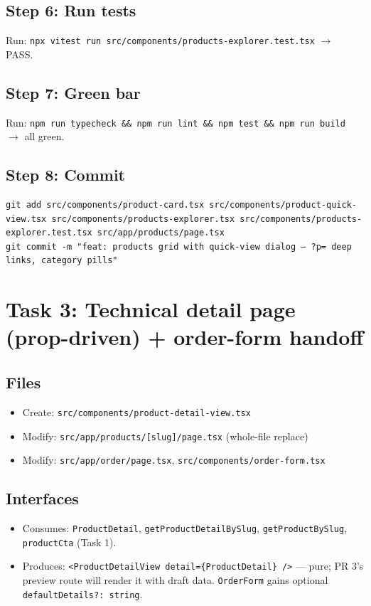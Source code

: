 \documentclass[11pt,a4paper]{article}
\begin{document}
\subsection*{Step 6: Run tests}

Run: \texttt{npx vitest run src/components/products-explorer.test.tsx} $\rightarrow$ PASS.

\subsection*{Step 7: Green bar}

Run: \texttt{npm run typecheck \&\& npm run lint \&\& npm test \&\& npm run build} $\rightarrow$
all green.

\subsection*{Step 8: Commit}

\begin{lstlisting}
git add src/components/product-card.tsx src/components/product-quick-view.tsx src/components/products-explorer.tsx src/components/products-explorer.test.tsx src/app/products/page.tsx
git commit -m "feat: products grid with quick-view dialog — ?p= deep links, category pills"
\end{lstlisting}

\section{Task 3: Technical detail page (prop-driven) + order-form handoff}

\subsection*{Files}
\begin{itemize}
  \item Create: \texttt{src/components/product-detail-view.tsx}
  \item Modify: \texttt{src/app/products/[slug]/page.tsx} (whole-file replace)
  \item Modify: \texttt{src/app/order/page.tsx}, \texttt{src/components/order-form.tsx}
\end{itemize}

\subsection*{Interfaces}
\begin{itemize}
  \item Consumes: \texttt{ProductDetail}, \texttt{getProductDetailBySlug},
        \texttt{getProductBySlug}, \texttt{productCta} (Task 1).
  \item Produces: \lstinline!<ProductDetailView detail={ProductDetail} />! --- pure; PR 3's
        preview route will render it with draft data. \texttt{OrderForm} gains optional
        \texttt{defaultDetails?: string}.
\end{itemize}
\end{document}
